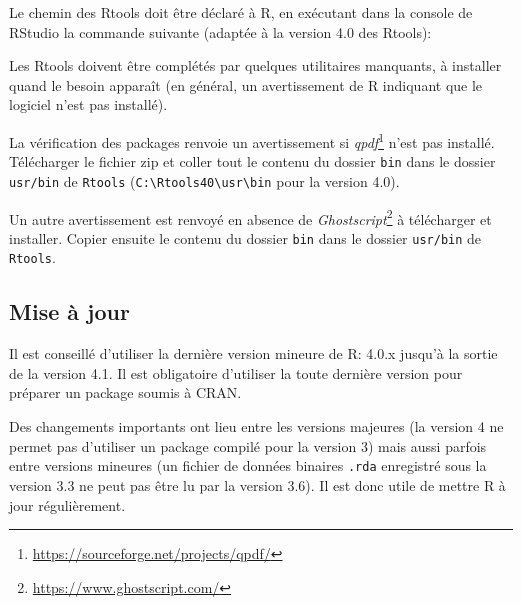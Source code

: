 \documentclass[
  12pt,
  french,
  a4paper,
  extrafontsizes,onecolumn,openright
  ]{memoir}
\newenvironment{Shaded}{\begin{snugshade}}{\end{snugshade}}
\newcommand{\CharTok}[1]{\textcolor[rgb]{0.31,0.60,0.02}{#1}}
\newcommand{\CommentTok}[1]{\textcolor[rgb]{0.56,0.35,0.01}{\textit{#1}}}
\newcommand{\DataTypeTok}[1]{\textcolor[rgb]{0.13,0.29,0.53}{#1}}
\newcommand{\KeywordTok}[1]{\textcolor[rgb]{0.13,0.29,0.53}{\textbf{#1}}}
\newcommand{\NormalTok}[1]{#1}
\newcommand{\StringTok}[1]{\textcolor[rgb]{0.31,0.60,0.02}{#1}}
\newlength{\rf}
\begin{document}
Le chemin des Rtools doit être déclaré à R, en exécutant dans la console de RStudio la commande suivante (adaptée à la version 4.0 des Rtools):

\scriptsize

\begin{Shaded}
\end{Shaded}

\normalsize

Les Rtools doivent être complétés par quelques utilitaires manquants, à installer quand le besoin apparaît (en général, un avertissement de R indiquant que le logiciel n'est pas installé).

La vérification des packages renvoie un avertissement si \emph{qpdf}\footnote{\url{https://sourceforge.net/projects/qpdf/}} n'est pas installé.
Télécharger le fichier zip et coller tout le contenu du dossier \texttt{bin} dans le dossier \texttt{usr/bin} de \texttt{Rtools} (\texttt{C:\textbackslash{}Rtools40\textbackslash{}usr\textbackslash{}bin} pour la version 4.0).

Un autre avertissement est renvoyé en absence de \emph{Ghostscript}\footnote{\url{https://www.ghostscript.com/}} à télécharger et installer.
Copier ensuite le contenu du dossier \texttt{bin} dans le dossier \texttt{usr/bin} de \texttt{Rtools}.

\hypertarget{mise-uxe0-jour}{%
\subsection{Mise à jour}\label{mise-uxe0-jour}}

Il est conseillé d'utiliser la dernière version mineure de R: 4.0.x jusqu'à la sortie de la version 4.1.
Il est obligatoire d'utiliser la toute dernière version pour préparer un package soumis à CRAN.

Des changements importants ont lieu entre les versions majeures (la version 4 ne permet pas d'utiliser un package compilé pour la version 3) mais aussi parfois entre versions mineures (un fichier de données binaires \texttt{.rda} enregistré sous la version 3.3 ne peut pas être lu par la version 3.6).
Il est donc utile de mettre R à jour régulièrement.
\end{document}

